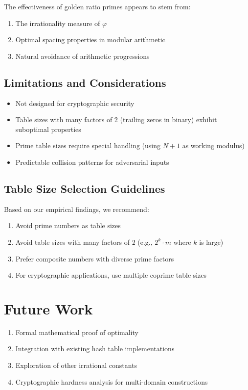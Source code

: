 \documentclass[11pt,a4paper]{article}
\theoremstyle{definition}
\begin{document}
The effectiveness of golden ratio primes appears to stem from:
\begin{enumerate}
\item The irrationality measure of $\varphi$
\item Optimal spacing properties in modular arithmetic
\item Natural avoidance of arithmetic progressions
\end{enumerate}

\subsection{Limitations and Considerations}

\begin{itemize}
\item Not designed for cryptographic security
\item Table sizes with many factors of 2 (trailing zeros in binary) exhibit suboptimal properties
\item Prime table sizes require special handling (using $N+1$ as working modulus)
\item Predictable collision patterns for adversarial inputs
\end{itemize}

\subsection{Table Size Selection Guidelines}

Based on our empirical findings, we recommend:
\begin{enumerate}
\item Avoid prime numbers as table sizes
\item Avoid table sizes with many factors of 2 (e.g., $2^k \cdot m$ where $k$ is large)
\item Prefer composite numbers with diverse prime factors
\item For cryptographic applications, use multiple coprime table sizes
\end{enumerate}

\section{Future Work}

\begin{enumerate}
\item Formal mathematical proof of optimality
\item Integration with existing hash table implementations
\item Exploration of other irrational constants
\item Cryptographic hardness analysis for multi-domain constructions
\end{enumerate}
\end{document}
